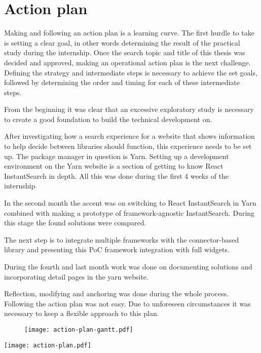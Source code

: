 
\chapter{Action plan}
\label{chp:action_plan}

Making and following an action plan is a learning curve. The first hurdle to take is setting a clear goal, in other words determining the result of the practical study during the internship.  Once the search topic and title of this thesis was decided and approved, making an operational action plan is the next challenge. Defining the strategy and intermediate steps is necessary to achieve the set goals, followed by determining the order and timing for each of these intermediate steps.

From the beginning it was clear that an excessive exploratory study is necessary to create a good foundation to build the technical development on. 

After investigating how a search experience for a website that shows information to help decide between libraries should function, this experience needs to be set up. The package manager in question is Yarn. Setting up a development environment on the Yarn website is a section of getting to know React InstantSearch in depth. All this was done during the first 4 weeks of the internship.

In the second month the accent was on switching to React InstantSearch in Yarn combined with making a prototype of framework-agnostic InstantSearch. During this stage the found solutions were compared. 

The next step is to integrate multiple frameworks with the connector-based library and presenting this PoC framework integration with full widgets.

During the fourth and last month work was done on documenting solutions and incorporating detail pages in the yarn website.

Reflection, modifying and anchoring was done during the whole process. Following the action plan was not easy. Due to unforeseen circumstances it was necessary to keep a flexible approach to this plan.

\begin{figure}
  \centering
  \texttt{[image: action-plan-gantt.pdf]}
\end{figure}

\newpage

\texttt{[image: action-plan.pdf]}
